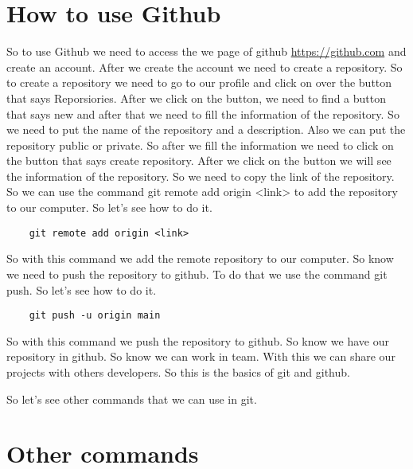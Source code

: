 \documentclass{article}
\begin{document}
\section*{How to use Github}
So to use Github we need to access the we page of github \url{https://github.com} and create an account. 
After we create the account we need to create a repository. So to create a repository we need to go to our profile and click on over the button that says Reporsiories. 
After we click on the button, we need to find a button that says new and after that we need to fill the information of the repository. 
So we need to put the name of the repository and a description. Also we can put the repository public or private. 
So after we fill the information we need to click on the button that says create repository. 
After we click on the button we will see the information of the repository. So we need to copy the link of the repository. 
So we can use the command git remote add origin <link> to add the repository to our computer. So let's see how to do it.
\begin{lstlisting}
    git remote add origin <link>
\end{lstlisting}
So with this command we add the remote repository to our computer. So know we need to push the repository to github.
To do that we use the command git push. So let's see how to do it.
\begin{lstlisting}
    git push -u origin main
\end{lstlisting}
So with this command we push the repository to github. So know we have our repository in github. So know we can work in team.
With this we can share our projects with others developers. So this is the basics of git and github.

So let's see other commands that we can use in git.

\section*{Other commands}
\end{document}

